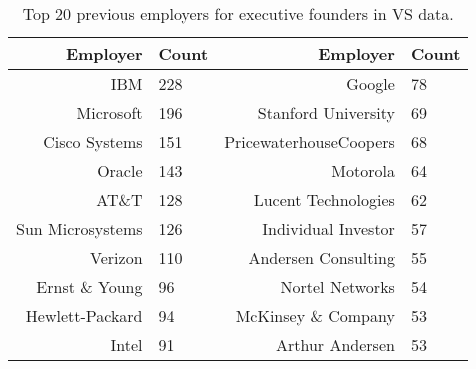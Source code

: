 \begin{table}[]
\centering
\begingroup\normalsize
\begin{tabular}{rlrl}
  \toprule
Employer & Count & Employer & Count \\ 
  \midrule
IBM & 228 & Google & 78 \\ 
  Microsoft & 196 & Stanford University & 69 \\ 
  Cisco Systems & 151 & PricewaterhouseCoopers & 68 \\ 
  Oracle & 143 & Motorola & 64 \\ 
  AT\&T & 128 & Lucent Technologies & 62 \\ 
  Sun Microsystems & 126 & Individual Investor & 57 \\ 
  Verizon & 110 & Andersen Consulting & 55 \\ 
  Ernst \& Young & 96 & Nortel Networks & 54 \\ 
  Hewlett-Packard & 94 & McKinsey \& Company & 53 \\ 
  Intel & 91 & Arthur Andersen & 53 \\ 
   \bottomrule
\end{tabular}
\endgroup
\caption{Top 20 previous employers for executive founders in VS data.} 
\label{table:VS_previousEmployersNoPositionsSummaryTable}
\end{table}
